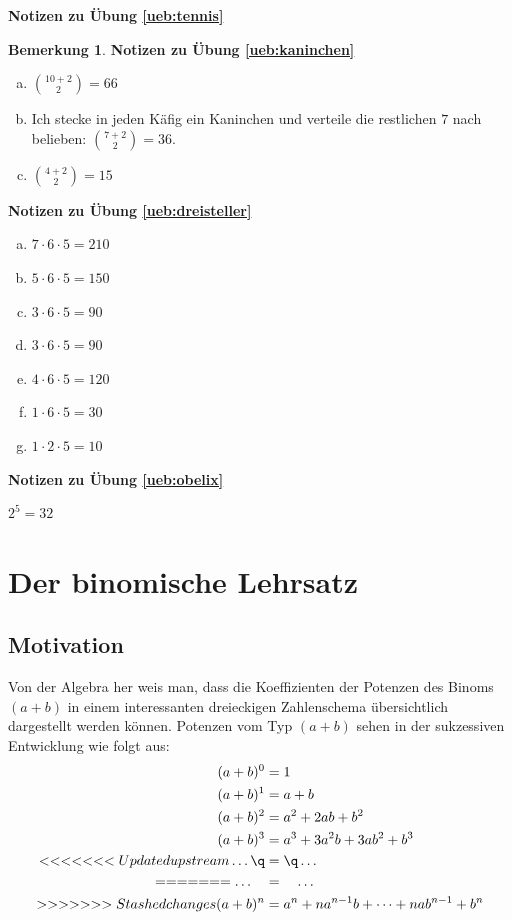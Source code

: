 \documentclass[%
<<<<<<< Updated upstream
11pt,%
twoside,%
titlepage,%
german,%
=======
11pt,%
twoside,%
titlepage,%
swissgerman,%
>>>>>>> Stashed changes
headsepline%
]{scrartcl}
\newcommand{\faReturnGray}{\textcolor{gray}{\faMailReply}} %
\theoremstyle{definition}
\newtheorem{bem}{Bemerkung}[subsection] %
\theoremstyle{plain}
\newcommand{\concatueb}[1]{ueb:#1}%
\newcommand{\concatlsg}[1]{lsg:#1}%
\newenvironment{lsg}[1]{%
    \par\noindent\textbf{Notizen zu Übung \ref{\concatueb{#1}}}\label{\concatlsg{#1}}
    \hfill\hyperref[\concatueb{#1}]{\faReturnGray}\par %
}{%
    \par%
}
\newcounter{theo}[section]\setcounter{theo}{0}
\newcommand{\concatueb}[1]{ueb:#1}%
\newcommand{\concatlsg}[1]{lsg:#1}%
\newenvironment{lsg}[1]{%
    \par\noindent\textbf{Notizen zu Übung \ref{\concatueb{#1}}.}%
    \label{\concatlsg{#1}}
}{%
    \par%
}
\begin{document}
\begin{lsg}{tennis}
\begin{bem}
\begin{lsg}{kaninchen}
\begin{enumerate}[a)]
\item $\binom{10+2}{2}=66$
\item Ich stecke in jeden K\"afig ein Kaninchen und verteile die restlichen $7$ nach belieben: $\binom{7+2}{2}=36$.
\item $\binom{4+2}{2}=15$
\end{enumerate}
\end{lsg}
\begin{lsg}{dreisteller}
\begin{enumerate}[a)]
\item $7\cdot6\cdot5=210$
\item $5\cdot6\cdot5=150$
\item $3\cdot6\cdot5=90$
\item $3\cdot6\cdot5=90$
\item $4\cdot6\cdot5=120$
\item $1\cdot6\cdot5=30$
\item $1\cdot2\cdot5=10$
\end{enumerate}
\end{lsg}
\begin{lsg}{obelix}
$2^{5}=32$
\end{lsg}

\clearpage

\section{Der binomische Lehrsatz} \label{app:binomial}

\subsection{Motivation}

Von der Algebra her weis man, dass die Koeffizienten der Potenzen des Binoms $(a+b)$ in einem interessanten dreieckigen Zahlenschema übersichtlich dargestellt werden können.
Potenzen vom Typ $(a+b)$ sehen in der sukzessiven Entwicklung wie folgt aus:
\begin{align*}
(a+b)^0&=1\\
(a+b)^1&=a+b\\
(a+b)^2&=a^2+2ab+b^2\\
(a+b)^3&=a^3+3a^2b+3ab^2+b^3\\
<<<<<<< Updated upstream
\dots\q &= \q\dots\\
=======
\dots\quad &= \quad\dots\\
>>>>>>> Stashed changes
(a+b)^n&=a^n+na^{n-1}b+\dots+nab^{n-1}+b^n
\end{align*}


\end{bem}
\end{lsg}
\end{document}
